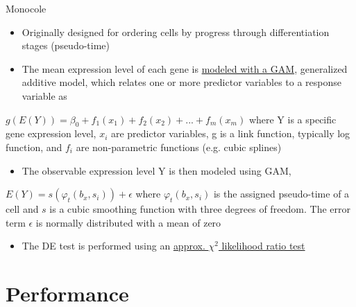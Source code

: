 \documentclass{beamer}\usepackage[]{graphicx}\usepackage[]{color}
\begin{document}
\begin{frame}
\begin{block}{Monocole}
\vspace{0.5cm}
\scriptsize
\begin{itemize}
\item Originally designed for ordering cells by progress through differentiation stages (pseudo-time)
\item The mean expression level of each gene is \underline{modeled with a GAM}, generalized additive model, which relates one or more predictor variables to a response variable as
\end{itemize}
   \begin{center}
    $g(E(Y))=\beta_0+f_1(x_1)+f_2(x_2)+...+f_m(x_m)$ where Y is a specific gene expression level, $x_i$ are predictor variables, g is a link function, typically log function, and $f_i$ are non-parametric functions (e.g. cubic splines)
  \end{center}
\begin{itemize}
\item The observable expression level Y is then modeled using GAM,
\end{itemize}
$E(Y)=s(\varphi_t(b_x, s_i))+\epsilon$ where $\varphi_t(b_x, s_i)$ is the assigned pseudo-time of a cell and $s$ is a cubic smoothing function with three degrees of freedom. The error term $\epsilon$ is normally distributed with a mean of zero
\begin{itemize}
\item The DE test is performed using an \underline{approx. $\chi^2$ likelihood ratio test}
\end{itemize}
\end{block}
\end{frame}



\section{Performance}
\begin{frame}
\begin{center}
\insertsection
\end{center}
\end{frame}
\end{document}
